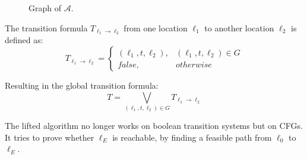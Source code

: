 \documentclass[11pt, a4paper, BCOR=10mm, ngerman]{scrbook}
\begin{document}
\begin{figure}[H]
\centering
{}
  \caption{Graph of $\mathcal{A}$.}
 \end{figure}
 \label{ex7} 

The transition formula $T_{\ell_1 \rightarrow \ell_2}$ from one location $\ell_1$ to another location $\ell_2$ is defined as:
\begin{equation*}
T_{\ell_1 \rightarrow \ell_2} = \begin{cases} (\ell_1, t, \ell_2), & (\ell_1, t, \ell_2) \in G \\
                     false, & otherwise
       \end{cases}
\end{equation*}

Resulting in the global transition formula: \\
$$ T = \bigvee_{(\ell_1, t, \ell_2) \in G} T_{\ell_1 \rightarrow \ell_2}$$

The lifted algorithm no longer works on boolean transition systems but on CFGs. It tries to prove whether $\ell_E$ is reachable, by finding a feasible path from $\ell_0$ to $\ell_E$.
\end{document}
